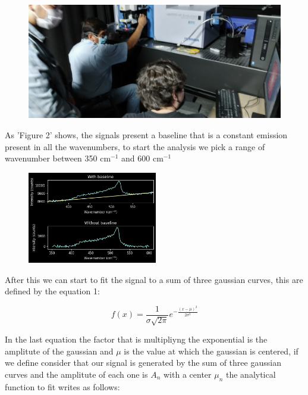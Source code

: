 \documentclass[a4paper,10pt,twocolumn]{article}
\begin{document}
\begin{figure}[h]
  \centering
  \includegraphics[scale=.055]{raman.jpg}
\end{figure}

As 'Figure 2' shows, the signals present a baseline that is a constant emission present in all the wavenumbers, to start the analysis we pick a range of wavenumber between 350 cm$^{-1}$ and 600 cm$^{-1}$

\begin{figure}[h]
  \centering
  \includegraphics[width=0.9\columnwidth, height=4cm]{baseline.png}
\end{figure}

After this we can start to fit the signal to a sum of three gaussian curves, this are defined by the equation 1:

\begin{equation}
f(x) = \frac{1}{\sigma \sqrt{2\pi}} e^{-\frac{(x - \mu)^2}{2\sigma^2}}
\end{equation}

In the last equation the factor that is multipliyng the exponential is the amplitute of the gaussian and  $\mu$ is the value at which the gaussian is centered, if we define consider that our signal is generated by the sum of three gaussian curves and the amplitute of each one is $A_{n}$ with a center $\mu_{n}$ the analytical function to fit writes as follows:
\end{document}
